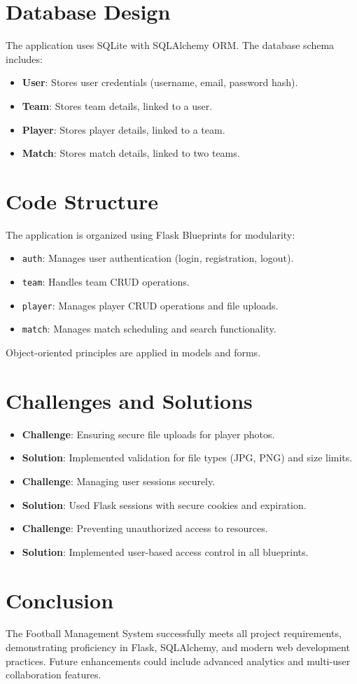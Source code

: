 \documentclass[a4paper,12pt]{article}
\begin{document}
\section{Database Design}
The application uses SQLite with SQLAlchemy ORM. The database schema includes:
\begin{itemize}
    \item \textbf{User}: Stores user credentials (username, email, password hash).
    \item \textbf{Team}: Stores team details, linked to a user.
    \item \textbf{Player}: Stores player details, linked to a team.
    \item \textbf{Match}: Stores match details, linked to two teams.
\end{itemize}

\section{Code Structure}
The application is organized using Flask Blueprints for modularity:
\begin{itemize}
    \item \texttt{auth}: Manages user authentication (login, registration, logout).
    \item \texttt{team}: Handles team CRUD operations.
    \item \texttt{player}: Manages player CRUD operations and file uploads.
    \item \texttt{match}: Manages match scheduling and search functionality.
\end{itemize}
Object-oriented principles are applied in models and forms.

\section{Challenges and Solutions}
\begin{itemize}
    \item \textbf{Challenge}: Ensuring secure file uploads for player photos.
    \item \textbf{Solution}: Implemented validation for file types (JPG, PNG) and size limits.
    \item \textbf{Challenge}: Managing user sessions securely.
    \item \textbf{Solution}: Used Flask sessions with secure cookies and expiration.
    \item \textbf{Challenge}: Preventing unauthorized access to resources.
    \item \textbf{Solution}: Implemented user-based access control in all blueprints.
\end{itemize}

\section{Conclusion}
The Football Management System successfully meets all project requirements, demonstrating proficiency in Flask, SQLAlchemy, and modern web development practices. Future enhancements could include advanced analytics and multi-user collaboration features.
\end{document}
